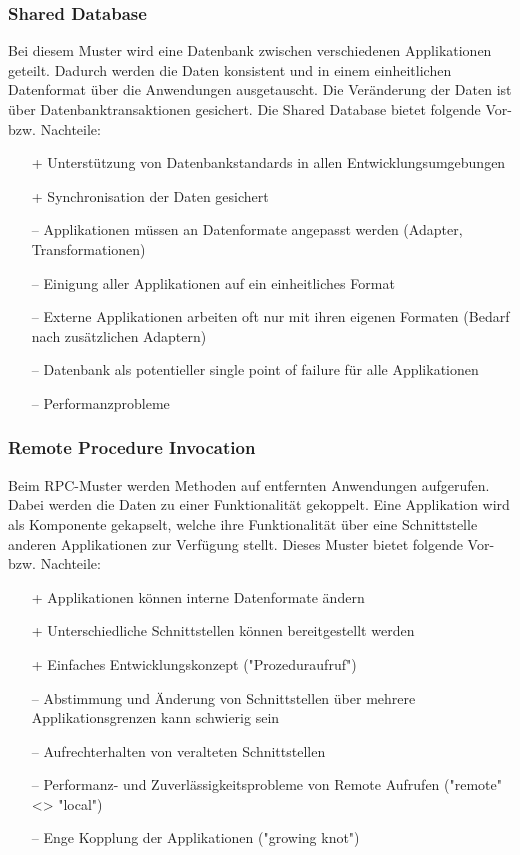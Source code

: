 \subsubsection{Shared Database}

Bei diesem Muster wird eine Datenbank zwischen verschiedenen Applikationen geteilt. Dadurch werden die Daten konsistent und in einem einheitlichen Datenformat über die Anwendungen ausgetauscht. Die Veränderung der Daten ist über Datenbanktransaktionen gesichert. Die Shared Database bietet folgende Vor- bzw. Nachteile:
\begin{itemize}
	\item[+] Unterstützung von Datenbankstandards in allen Entwicklungsumgebungen
	\item[+] Synchronisation der Daten gesichert
	\item[--] Applikationen müssen an Datenformate angepasst werden (Adapter, Transformationen)
	\item[--] Einigung aller Applikationen auf ein einheitliches Format
	\item[--] Externe Applikationen arbeiten oft nur mit ihren eigenen Formaten (Bedarf nach zusätzlichen Adaptern)
	\item[--] Datenbank als potentieller single point of failure für alle Applikationen
	\item[--] Performanzprobleme
\end{itemize}

\subsubsection{Remote Procedure Invocation}

Beim RPC-Muster werden Methoden auf entfernten Anwendungen aufgerufen. Dabei werden die Daten zu einer Funktionalität gekoppelt. Eine Applikation wird als Komponente gekapselt, welche ihre Funktionalität über eine Schnittstelle anderen Applikationen zur Verfügung stellt. Dieses Muster bietet folgende Vor- bzw. Nachteile:
\begin{itemize}
	\item[+] Applikationen können interne Datenformate ändern
	\item[+] Unterschiedliche Schnittstellen können bereitgestellt werden
	\item[+] Einfaches Entwicklungskonzept ("Prozeduraufruf")
	\item[--] Abstimmung und Änderung von Schnittstellen über mehrere Applikationsgrenzen kann schwierig sein
	\item[--] Aufrechterhalten von veralteten Schnittstellen
	\item[--] Performanz- und Zuverlässigkeitsprobleme von Remote Aufrufen ("remote" <> "local")
	\item[--] Enge Kopplung der Applikationen ("growing knot")
\end{itemize}

